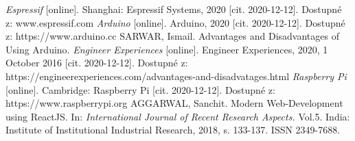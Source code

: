 \documentclass[twoside]{ctuthesis}
\theoremstyle{plain}
\theoremstyle{definition}
\theoremstyle{note}
\begin{document}
\begin{thebibliography}{46}
 \textit{Espressif} [online]. Shanghai: Espressif Systems, 2020 [cit. 2020-12-12]. Dostupné z: www.espressif.com
 \textit{Arduino} [online]. Arduino, 2020 [cit. 2020-12-12]. Dostupné z: https://www.arduino.cc
 SARWAR, Ismail. Advantages and Disadvantages of Using Arduino. \textit{Engineer Experiences} [online]. Engineer Experiences, 2020, 1 October 2016 [cit. 2020-12-12]. Dostupné z: https://engineerexperiences.com/advantages-and-disadvatages.html
 \textit{Raspberry Pi} [online]. Cambridge: Raspberry Pi [cit. 2020-12-12]. Dostupné z: https://www.raspberrypi.org
 AGGARWAL, Sanchit. Modern Web-Development using ReactJS. In:  \textit{International Journal of Recent Research Aspects.} Vol.5. India: Institute of Institutional Industrial Research, 2018, s. 133-137. ISSN 2349-7688.
\end{thebibliography}
\end{document}
